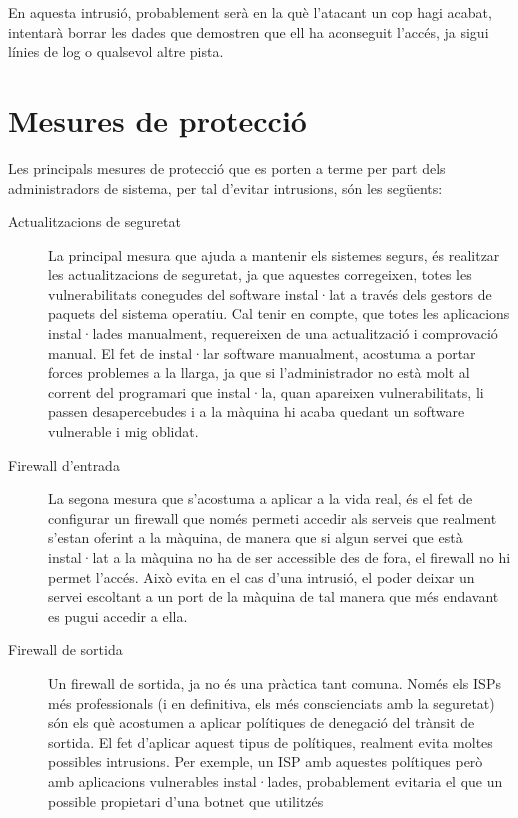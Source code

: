 En aquesta intrusió, probablement serà en la què l'atacant un cop hagi acabat, intentarà borrar les dades que demostren que
ell ha aconseguit l'accés, ja sigui línies de log o qualsevol altre pista.

\section{Mesures de protecció}

Les principals mesures de protecció que es porten a terme per part dels administradors de sistema, per tal d'evitar
intrusions, són les següents:

\begin{description}
    \item[Actualitzacions de seguretat] La principal mesura que ajuda a mantenir els sistemes segurs, és
        realitzar les actualitzacions de seguretat, ja que aquestes corregeixen, totes les vulnerabilitats
        conegudes del software instal·lat a través dels gestors de paquets del sistema operatiu. Cal tenir 
        en compte, que totes les aplicacions instal·lades manualment, requereixen de una actualització i 
        comprovació manual. El fet de instal·lar software manualment, acostuma a portar forces problemes 
        a la llarga, ja que si l'administrador no està molt al corrent del programari que instal·la,
        quan apareixen vulnerabilitats, li passen desapercebudes i a la màquina hi acaba quedant un software 
        vulnerable i mig oblidat.
    \item[Firewall d'entrada] La segona mesura que s'acostuma a aplicar a la vida real, és el fet de configurar
        un firewall que només permeti accedir als serveis que realment s'estan oferint a la màquina, de manera
        que si algun servei que està instal·lat a la màquina no ha de ser accessible des de fora, el firewall
        no hi permet l'accés. Això evita en el cas d'una intrusió, el poder deixar un servei escoltant a un port
        de la màquina de tal manera que més endavant es pugui accedir a ella.
    \item[Firewall de sortida] Un firewall de sortida, ja no és una pràctica tant comuna. Només els ISPs més 
        professionals (i en definitiva, els més conscienciats amb la seguretat) són els què acostumen a aplicar 
        polítiques de denegació del trànsit de sortida. El fet d'aplicar aquest tipus de polítiques, realment
        evita moltes possibles intrusions. Per exemple, un ISP amb aquestes polítiques però amb aplicacions 
        vulnerables instal·lades, probablement evitaria el que un possible propietari d'una botnet que utilitzés

\end{description}
